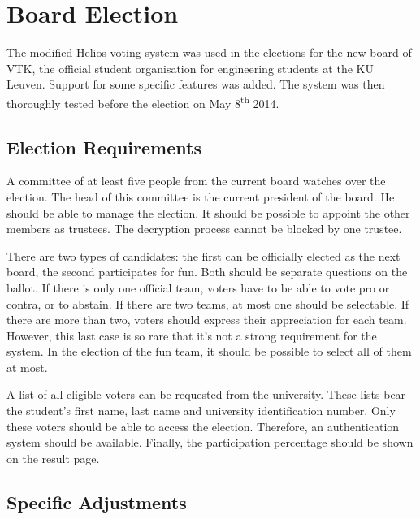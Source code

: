 % 
%

\section{Board Election}
\label{sec:board_election}

The modified Helios voting system was used in the elections for the new board of VTK, the official student organisation for engineering students at the KU Leuven. Support for some specific features was added. The system was then thoroughly tested before the election on May 8\textsuperscript{th} 2014.

\subsection{Election Requirements}

A committee of at least five people from the current board watches over the election. The head of this committee is the current president of the board. He should be able to manage the election. It should be possible to appoint the other members as trustees. The decryption process cannot be blocked by one trustee.

\par There are two types of candidates: the first can be officially elected as the next board, the second participates for fun. Both should be separate questions on the ballot. If there is only one official team, voters have to be able to vote pro or contra, or to abstain. If there are two teams, at most one should be selectable. If there are more than two, voters should express their appreciation for each team. However, this last case is so rare that it's not a strong requirement for the system. In the election of the fun team, it should be possible to select all of them at most.

\par A list of all eligible voters can be requested from the university. These lists bear the student's first name, last name and university identification number. Only these voters should be able to access the election. Therefore, an authentication system should be available. Finally, the participation percentage should be shown on the result page.

\subsection{Specific Adjustments}


